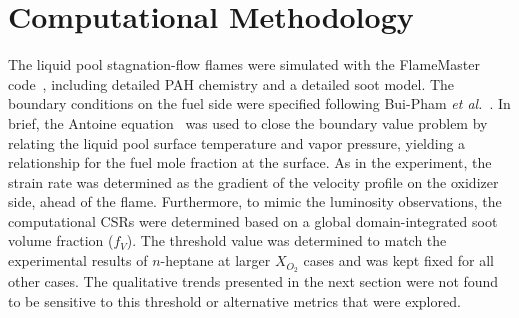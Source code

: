\documentclass[review,3p,times]{elsarticleUS}
\begin{document}
\section{Computational Methodology}

The liquid pool stagnation-flow flames were simulated with the FlameMaster code~\cite{flamemaster}, including detailed PAH chemistry and a detailed soot model. The boundary conditions on the fuel side were specified following Bui-Pham \emph{et al.}~\cite{buipham91}. In brief, the Antoine equation~\cite{polingbook} was used to close the boundary value problem by relating the liquid pool surface temperature and vapor pressure, yielding a relationship for the fuel mole fraction at the surface. As in the experiment, the strain rate was determined as the gradient of the velocity profile on the oxidizer side, ahead of the flame. Furthermore, to mimic the luminosity observations, the computational CSRs were determined based on a global domain-integrated soot volume fraction ($f_V$). The threshold value was determined to match the experimental results of $n$-heptane at larger $X_{O_2}$ cases and was kept fixed for all other cases. The qualitative trends presented in the next section were not found to be sensitive to 
this threshold or alternative metrics that were explored.
\end{document}
